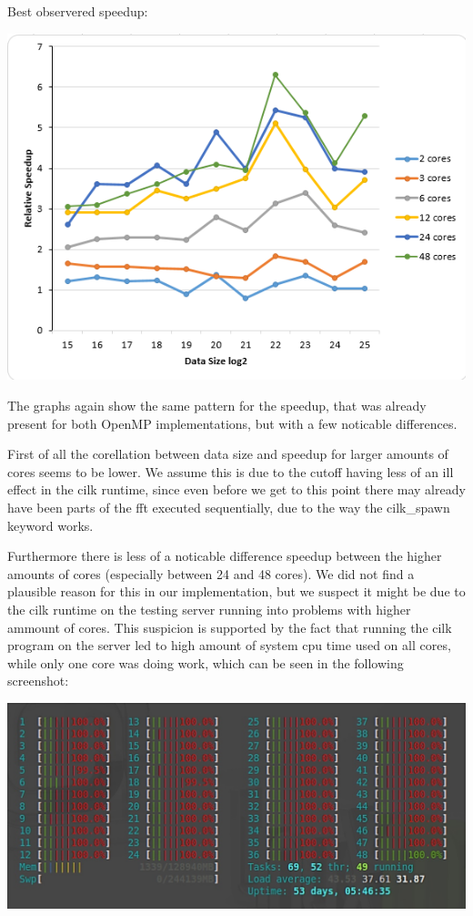 Best observered speedup:

\includegraphics[width=\textwidth]{cilk_rec_best.png}

The graphs again show the same pattern for the speedup, that was already present for both OpenMP implementations, but with a few noticable differences.

First of all the corellation between data size and speedup for larger amounts of cores seems to be lower. We assume this is due to the cutoff having less of an ill effect in the cilk runtime, since even before we get to this point there may already have been parts of the fft executed sequentially, due to the way the cilk_spawn keyword works. 

Furthermore there is less of a noticable difference speedup between the higher amounts of cores (especially between 24 and 48 cores). We did not find a plausible reason for this in our implementation, but we suspect it might be due to the cilk runtime on the testing server running into problems with higher ammount of cores. This suspicion is supported by the fact that running the cilk program on the server led to high amount of system cpu time used on all cores, while only one core was doing work, which can be seen in the following screenshot: 

\includegraphics[width=\textwidth]{cpu_util_cilk.jpg}
